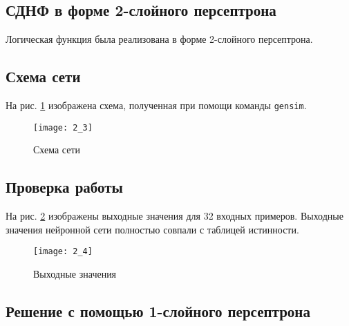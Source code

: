 
\subsection{СДНФ в форме 2-слойного персептрона}


Логическая функция была реализована в форме 2-слойного персептрона. 

\subsection{Схема сети}



На рис. \ref{fig:2_3} изображена схема, полученная при помощи команды \verb+gensim+.

\begin{figure}[H]
\begin{center}
	\texttt{[image: 2\_3]}
	\caption{Схема сети}
	\label{fig:2_3}
\end{center}
\end{figure}

\subsection{Проверка работы}


На рис. \ref{fig:2_4} изображены выходные значения для 32 входных примеров. Выходные значения нейронной сети полностью совпали с таблицей истинности.

\begin{figure}[H]
\begin{center}
	\texttt{[image: 2\_4]}
	\caption{Выходные значения}
	\label{fig:2_4}
\end{center}
\end{figure}

\subsection{Решение с помощью 1-слойного персептрона}



